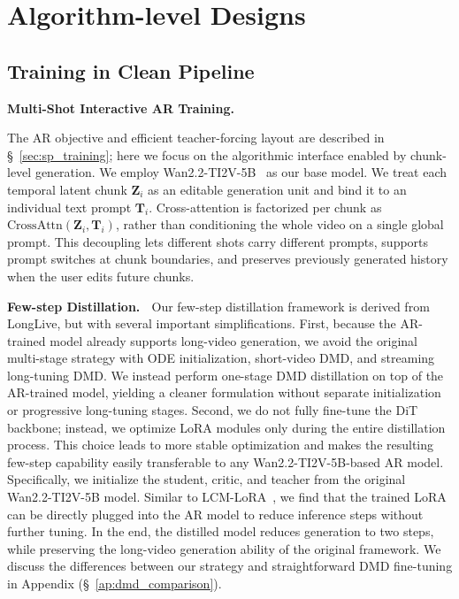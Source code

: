 \section{Algorithm-level Designs}
\subsection{Training in Clean Pipeline}
\textbf{Multi-Shot Interactive AR Training.}\label{sec:interactive_training}$\;$

The AR objective and efficient teacher-forcing layout are described in \S~\ref{sec:sp_training}; here we focus on the algorithmic interface enabled by chunk-level generation. We employ Wan2.2-TI2V-5B~\cite{wan} as our base model.
We treat each temporal latent chunk $\mathbf{Z}_i$ as an editable generation unit and bind it to an individual text prompt $\mathbf{T}_i$.
Cross-attention is factorized per chunk as $\text{CrossAttn}(\mathbf{Z}_i, \mathbf{T}_i)$, rather than conditioning the whole video on a single global prompt.
This decoupling lets different shots carry different prompts, supports prompt switches at chunk boundaries, and preserves previously generated history when the user edits future chunks.



\textbf{Few-step Distillation.} \label{sec:dmd}$\;$
Our few-step distillation framework is derived from LongLive, but with several important simplifications. 
First, because the AR-trained model already supports long-video generation, we avoid the original multi-stage strategy with ODE initialization, short-video DMD, and streaming long-tuning DMD.
We instead perform one-stage DMD distillation on top of the AR-trained model, yielding a cleaner formulation without separate initialization or progressive long-tuning stages. 
Second, we do not fully fine-tune the DiT backbone; instead, we optimize LoRA modules only during the entire distillation process. This choice leads to more stable optimization and makes the resulting few-step capability easily transferable to any Wan2.2-TI2V-5B-based AR model. 
Specifically, we initialize the student, critic, and teacher from the original Wan2.2-TI2V-5B model. Similar to LCM-LoRA~\cite{luo2023lcm}, we find that the trained LoRA can be directly plugged into the AR model to reduce inference steps without further tuning.
In the end, the distilled model reduces generation to two steps, while preserving the long-video generation ability of the original framework.
We discuss the differences between our strategy and straightforward DMD fine-tuning in Appendix (\S~\ref{ap:dmd_comparison}).

